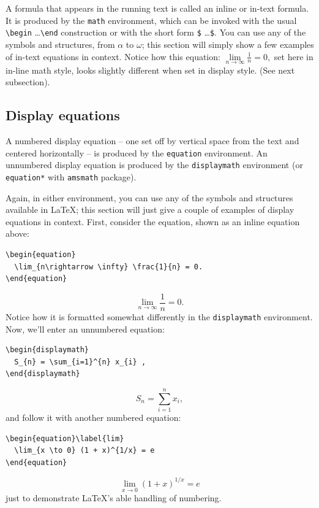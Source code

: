 \documentclass[a4paper]{jpconf}
\begin{document}
A formula that appears in the running text is called an inline or
in-text formula.  It is produced by the \verb|math| environment,
which can be invoked with the usual
\verb|\begin| \ldots \verb|\end| construction or with
the short form \verb|$| \ldots \verb|$|. You can use any of the symbols
and structures, from $\alpha$ to $\omega$;
this section will simply show a few
examples of in-text equations in context. Notice how this equation:
\begin{math}
  \lim\limits_{n\rightarrow \infty} \frac{1}{n} = 0,
\end{math}
set here in in-line math style, looks slightly different when
set in display style.  (See next subsection).

\subsection{Display equations}

A numbered display equation -- one set off by vertical space from the
text and centered horizontally -- is produced by the \verb|equation|
environment. An unnumbered display equation is produced by the
\verb|displaymath| environment (or \verb|equation*| with \verb|amsmath| package).

Again, in either environment, you can use any of the symbols and
structures available in \LaTeX{}; this section will just give a couple
of examples of display equations in context.  First, consider the
equation, shown as an inline equation above:
\begin{verbatim}
\begin{equation}
  \lim_{n\rightarrow \infty} \frac{1}{n} = 0.
\end{equation}
\end{verbatim}
\begin{equation}
  \lim_{n\rightarrow \infty} \frac{1}{n} = 0.
\end{equation}
Notice how it is formatted somewhat differently in
the \verb|displaymath|
environment.  Now, we'll enter an unnumbered equation:
\begin{verbatim}
\begin{displaymath}
  S_{n} = \sum_{i=1}^{n} x_{i} ,
\end{displaymath}
\end{verbatim}
\begin{displaymath}
  S_{n} = \sum_{i=1}^{n} x_{i} ,
\end{displaymath}
and follow it with another numbered equation:
\begin{verbatim}
\begin{equation}\label{lim}
  \lim_{x \to 0} (1 + x)^{1/x} = e
\end{equation}
\end{verbatim}
\begin{equation}\label{lim}
\lim_{x \to 0} (1 + x)^{1/x} = e
\end{equation}
just to demonstrate \LaTeX's able handling of numbering.
\end{document}
